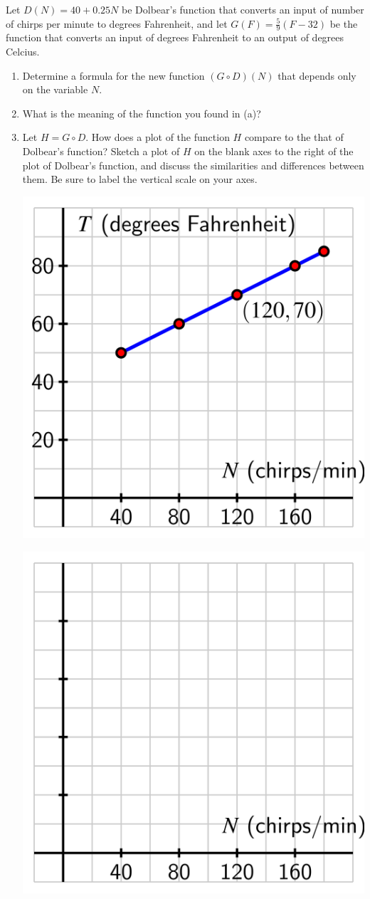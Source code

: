 \documentclass{ximera}
\begin{document}
\begin{exploration}
Let $D(N) = 40 + 0.25N$ be Dolbear's function that converts an input of number of chirps per minute to degrees Fahrenheit, and let $G(F) = \frac{5}{9}(F-32)$ be the function that converts an input of degrees Fahrenheit to an output of degrees Celcius.
\begin{enumerate}[label=\alph*.]
\item Determine a formula for the new function $(G \circ D)(N)$ that depends only on the variable $N$.
\item What is the meaning of the function you found in (a)?
\item Let $H= G \circ D$. How does a plot of the function $H$ compare to the that of Dolbear's function?  Sketch a plot of $H$ on the blank axes to the right of the plot of Dolbear's function, and discuss the similarities and differences between them.  Be sure to label the vertical scale on your axes.
\begin{image}
\includegraphics[width=.7\textwidth]{functions-Dolbears-Law.jpg}
\end{image}

\begin{image}
\includegraphics[width=.7\textwidth]{composite-Dolbears-Law-celcius-blank.jpg}
\end{image}

\end{enumerate}
\end{exploration}
\end{document}
